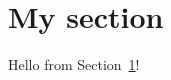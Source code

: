 \documentclass{article}
\begin{document}
\section{My section}
\label{sec:ms}

Hello from Section~\ref{sec:ms}!
\end{document}

